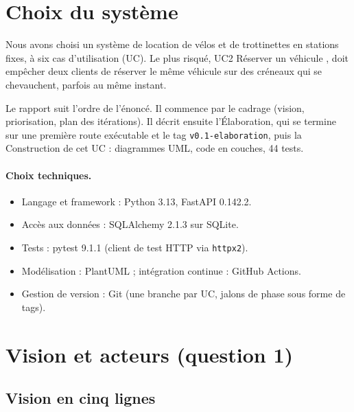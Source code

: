 \documentclass[11pt,a4paper]{article}
\begin{document}
\section{Choix du système}

Nous avons choisi un système de location de vélos et de trottinettes en stations
fixes, à six cas d'utilisation (UC). Le plus risqué, UC2 \og Réserver un
véhicule \fg{}, doit empêcher deux clients de réserver le même véhicule sur des
créneaux qui se chevauchent, parfois au même instant.

Le rapport suit l'ordre de l'énoncé. Il commence par le cadrage (vision,
priorisation, plan des itérations). Il décrit ensuite l'Élaboration, qui se termine
sur une première route exécutable et le tag \texttt{v0.1-elaboration}, puis la
Construction de cet UC : diagrammes UML, code en couches, 44 tests.

\paragraph{Choix techniques.}
\begin{itemize}
  \item Langage et framework : Python 3.13, FastAPI 0.142.2.
  \item Accès aux données : SQLAlchemy 2.1.3 sur SQLite.
  \item Tests : pytest 9.1.1 (client de test HTTP via \texttt{httpx2}).
  \item Modélisation : PlantUML ; intégration continue : GitHub Actions.
  \item Gestion de version : Git (une branche par UC, jalons de phase sous forme de tags).
\end{itemize}

\section{Vision et acteurs (question 1)}

\subsection{Vision en cinq lignes}
\end{document}
